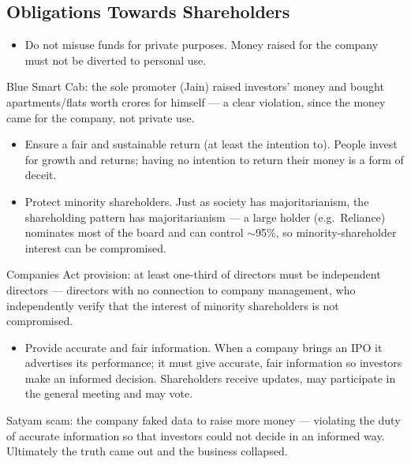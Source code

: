 \subsection{Obligations Towards Shareholders}
\begin{itemize}
\item Do not misuse funds for private purposes. Money raised for the company must not be diverted to personal use.
\end{itemize}

\begin{ExampleBox}
Blue Smart Cab: the sole promoter (Jain) raised investors' money and bought apartments/flats worth crores for himself --- a clear violation, since the money came for the company, not private use.
\end{ExampleBox}

\begin{itemize}
\item Ensure a fair and sustainable return (at least the intention to). People invest for growth and returns; having no intention to return their money is a form of deceit.
\item Protect minority shareholders. Just as society has majoritarianism, the shareholding pattern has majoritarianism --- a large holder (e.g.\ Reliance) nominates most of the board and can control $\sim$95\%, so minority-shareholder interest can be compromised.
\end{itemize}

\begin{GovtPolicy}
Companies Act provision: at least one-third of directors must be independent directors --- directors with no connection to company management, who independently verify that the interest of minority shareholders is not compromised.
\end{GovtPolicy}

\begin{itemize}
\item Provide accurate and fair information. When a company brings an IPO it advertises its performance; it must give accurate, fair information so investors make an informed decision. Shareholders receive updates, may participate in the general meeting and may vote.
\end{itemize}

\begin{ExampleBox}
Satyam scam: the company faked data to raise more money --- violating the duty of accurate information so that investors could not decide in an informed way. Ultimately the truth came out and the business collapsed.
\end{ExampleBox}

